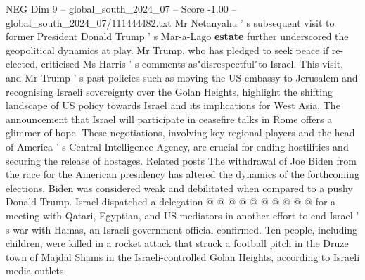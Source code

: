 \begin{textsample}{NEG Dim 9 – global\_south\_2024\_07 – Score -1.00 – global\_south\_2024\_07/111444482.txt}
Mr Netanyahu ' s subsequent visit to former President Donald Trump ' s Mar-a-Lago \textbf{estate} further underscored the geopolitical dynamics at play.
Mr Trump, who has pledged to seek peace if re-elected, criticised Ms Harris ' s comments as"disrespectful"to Israel.
This visit, and Mr Trump ' s past policies such as moving the US embassy to Jerusalem and recognising Israeli sovereignty over the Golan Heights, highlight the shifting landscape of US policy towards Israel and its implications for West Asia.
The announcement that Israel will participate in ceasefire talks in Rome offers a glimmer of hope.
These negotiations, involving key regional players and the head of America ' s Central Intelligence Agency, are crucial for ending hostilities and securing the release of hostages.
Related posts The withdrawal of Joe Biden from the race for the American presidency has altered the dynamics of the forthcoming elections.
Biden was considered weak and debilitated when compared to a pushy Donald Trump.
Israel dispatched a delegation @ @ @ @ @ @ @ @ @ @ for a meeting with Qatari, Egyptian, and US mediators in another effort to end Israel ' s war with Hamas, an Israeli government official confirmed.
Ten people, including children, were killed in a rocket attack that struck a football pitch in the Druze town of Majdal Shams in the Israeli-controlled Golan Heights, according to Israeli media outlets.

\end{textsample}
